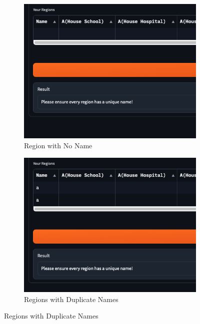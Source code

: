 \documentclass[12pt]{report}
\begin{document}
\begin{figure}[H]
\centering
\begin{subfigure}{.45\linewidth}
    \centering
    \includegraphics[width=\linewidth]{ss20.8a.png}
    \caption{Region with No Name}
\end{subfigure}
\begin{subfigure}{.45\linewidth}
    \centering
    \includegraphics[width=\linewidth]{ss20.8b.png}
    \caption{Regions with Duplicate Names}
\end{subfigure}


\end{figure}
\end{document}
